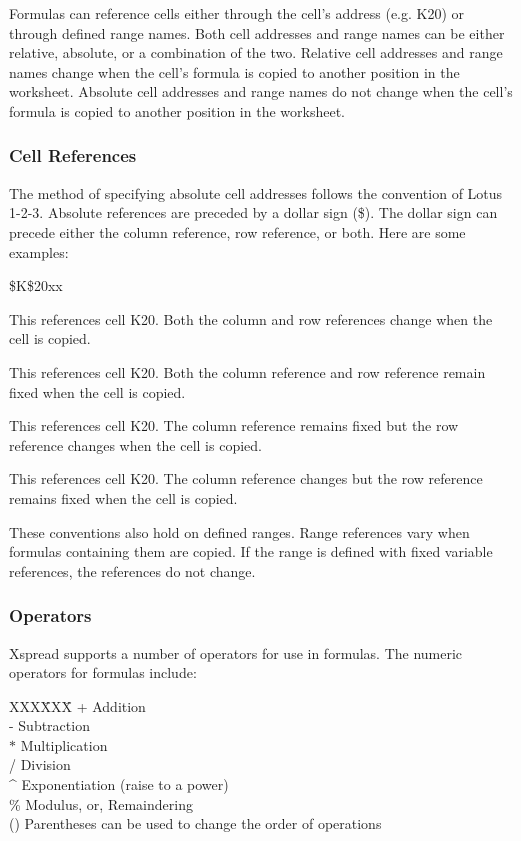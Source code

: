     Formulas can reference cells either through the cell's address (e.g. K20) 
or through defined range names.  Both cell addresses and range names can be 
either relative, absolute, or a combination of the two.  Relative cell 
addresses and range names change when the cell's formula is copied to another 
position in the worksheet.  Absolute cell addresses and range names do not 
change when the cell's formula is copied to another position in the worksheet.

\subsubsection*{Cell References}

    The method of specifying absolute cell addresses follows the convention of 
Lotus 1-2-3.  Absolute references are preceded by a dollar sign (\$).  The
dollar sign can precede either the column reference, row reference, or both.  
Here are some examples:
\begin{namelist}{\$K\$20xx}
\item[K20]{This references cell K20.  Both the column and row references
change when the cell is copied.}

\item[\$K\$20]{This references cell K20.  Both the column reference and row
reference remain fixed when the cell is copied.}

\item[\$K20]{This references cell K20.  The column reference remains fixed but
the row reference changes when the cell is copied.}

\item[K\$20]{This references cell K20.  The column reference changes but the
row reference remains fixed when the cell is copied.}
\end{namelist}

    These conventions also hold on defined ranges.  Range references vary when 
formulas containing them are copied.  If the range is defined with fixed 
variable references, the references do not change.

\subsubsection*{Operators}

    Xspread supports a number of operators for use in formulas.  The numeric 
operators for formulas include:
\begin{tabbing}
XXX\=XXX\=\kill
 \> +   \> 	Addition\\
 \> -   \> 	Subtraction\\
 \> $*$ \> 	Multiplication\\
 \> /   \> 	Division\\
 \> \^{ } \>   	Exponentiation (raise to a power)\\
 \> \%   \> 	Modulus, or, Remaindering\\
 \> ()  \> 	Parentheses can be used to change the order of operations
\end{tabbing}

